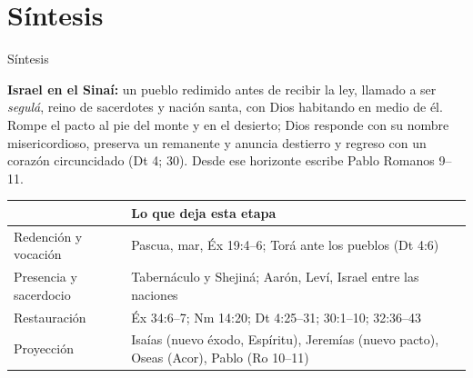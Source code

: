 \section{Síntesis}
\begin{frame}{Síntesis}
\begin{tcolorbox}[colback=piedra,colframe=ladrillo,boxrule=1pt,arc=3pt,fontupper=\small]
\textbf{\textcolor{cafe}{Israel en el Sinaí:}} un pueblo redimido antes de recibir la ley, llamado a ser \emph{segulá}, reino de sacerdotes y nación santa, con Dios habitando en medio de él. Rompe el pacto al pie del monte y en el desierto; Dios responde con su nombre misericordioso, preserva un remanente y anuncia destierro y regreso con un corazón circuncidado (Dt 4; 30). Desde ese horizonte escribe Pablo Romanos 9--11.
\end{tcolorbox}
\scriptsize\renewcommand{\arraystretch}{1.3}
\begin{tabular}{>{\RaggedRight\arraybackslash}p{3.0cm}>{\RaggedRight\arraybackslash}p{8.4cm}}
\toprule
{\color{ladrillo}\bfseries Eje} & {\color{ladrillo}\bfseries Lo que deja esta etapa}\\\midrule
Redención y vocación & Pascua, mar, Éx 19:4--6; Torá ante los pueblos (Dt 4:6)\\
Presencia y sacerdocio & Tabernáculo y Shejiná; Aarón, Leví, Israel entre las naciones\\
Restauración & Éx 34:6--7; Nm 14:20; Dt 4:25--31; 30:1--10; 32:36--43\\
Proyección & Isaías (nuevo éxodo, Espíritu), Jeremías (nuevo pacto), Oseas (Acor), Pablo (Ro 10--11)\\
\bottomrule
\end{tabular}
\elabpropia
\end{frame}

